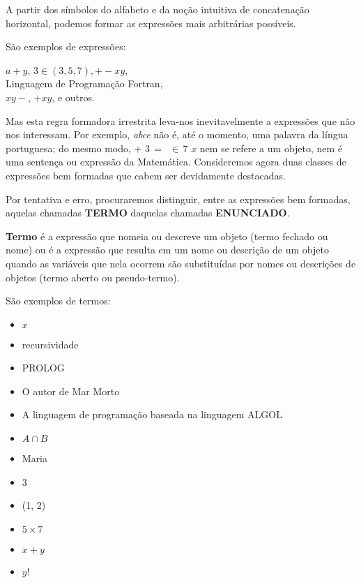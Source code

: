 \documentclass[
	14pt,				%
	twoside,			%
	a4paper,			%
	english,			%
	french,				%
	spanish,			%
	brazil,				%
    ]{abntex2}
\begin{document}
A partir dos símbolos do alfabeto e da noção intuitiva de concatenação horizontal, podemos formar as expressões mais arbitrárias possíveis.

São exemplos de expressões:

\vskip 1cm

\indent \indent $a + y$, $3 \in (3, 5, 7), +-xy$,\\
\indent \indent Linguagem de Programação Fortran,\\
\indent \indent $xy-$, $+xy$, e outros.

\newpage

Mas esta regra formadora irrestrita leva-nos inevitavelmente a expressões que não nos interessam.
Por exemplo, \textit{abce} não é, até o momento, uma palavra da língua portuguesa; do mesmo modo, $+\,\, 3 \,=\,\,\, \in\, 7\,\, x$ nem se refere a um objeto, nem é uma sentença ou expressão da Matemática.
Consideremos agora duas classes de expressões bem formadas que cabem ser devidamente destacadas.

Por tentativa e erro, procuraremos distinguir, entre as expressões bem formadas, aquelas chamadas \textbf{TERMO} daquelas chamadas \textbf{ENUNCIADO}.

\vskip 0.5cm

\begin{addmargin}[2.0cm]{0cm}
\textbf{Termo} é a expressão que nomeia ou descreve um objeto (termo fechado ou nome) ou é a expressão que resulta em um nome ou descrição de um objeto quando as variáveis que nela ocorrem são substituídas por nomes ou descrições de objetos (termo aberto ou pseudo-termo).
\end{addmargin}

\vskip 0.5cm


\noindent São exemplos de termos:

\begin{itemize}[itemsep=0.01pt]
\renewcommand\labelitemi{\textbf{-}}
    \item $x$
    \item recursividade
    \item PROLOG
    \item  O autor de Mar Morto
    \item  A linguagem de programação baseada na linguagem ALGOL
    \item $A \cap B$
    \item Maria
    \item 3
    \item (1, 2)
    \item $5 \times 7$
    \item $x + y$
    \item $y!$

\end{itemize}
\end{document}

